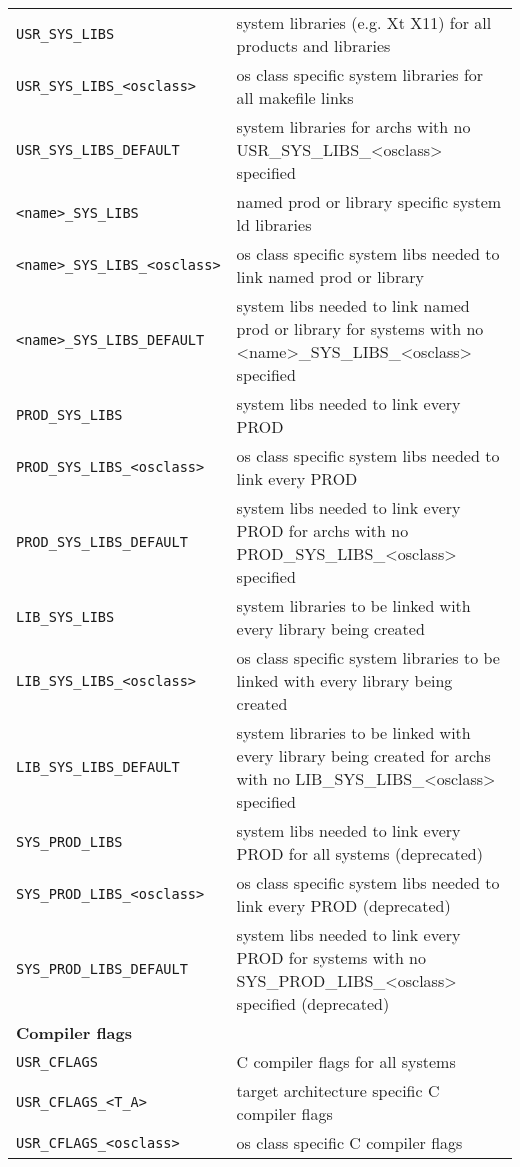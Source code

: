 \begin{center}
\begin{longtable}{p{2.94784in}p{3.76247in}}
\verb|USR_SYS_LIBS| & system libraries (e.g. Xt X11) for all products and libraries\\
\verb|USR_SYS_LIBS_<osclass>| & os class specific system libraries for all makefile links\\
\verb|USR_SYS_LIBS_DEFAULT| & system libraries for archs with no USR\_SYS\_LIBS\_\textless{}osclass\textgreater{} specified\\
\verb|<name>_SYS_LIBS| & named prod or library specific system ld libraries\\
\verb|<name>_SYS_LIBS_<osclass>| & os class specific system libs needed to link named prod or library\\
\verb|<name>_SYS_LIBS_DEFAULT| & system libs needed to link named prod or library for systems with no \textless{}name\textgreater{}\_SYS\_LIBS\_\textless{}osclass\textgreater{} specified\\
\verb|PROD_SYS_LIBS| & system libs needed to link every PROD\\
\verb|PROD_SYS_LIBS_<osclass>| & os class specific system libs needed to link every PROD\\
\verb|PROD_SYS_LIBS_DEFAULT| & system libs needed to link every PROD for archs with no PROD\_SYS\_LIBS\_\textless{}osclass\textgreater{} specified\\
\verb|LIB_SYS_LIBS| & system libraries to be linked with every library being created\\
\verb|LIB_SYS_LIBS_<osclass>| & os class specific system libraries to be linked with every library being created\\
\verb|LIB_SYS_LIBS_DEFAULT| & system libraries to be linked with every library being created for archs with no LIB\_SYS\_LIBS\_\textless{}osclass\textgreater{} specified\\
\verb|SYS_PROD_LIBS| & system libs needed to link every PROD for all systems (deprecated)\\
\verb|SYS_PROD_LIBS_<osclass>| & os class specific system libs needed to link every PROD (deprecated)\\
\verb|SYS_PROD_LIBS_DEFAULT| & system libs needed to link every PROD for systems with no SYS\_PROD\_LIBS\_\textless{}osclass\textgreater{} specified (deprecated)\\
\textbf{Compiler flags} & \\
\hline
\verb|USR_CFLAGS| & C compiler flags for all systems\\
\verb|USR_CFLAGS_<T_A>| & target architecture specific C compiler flags\\
\verb|USR_CFLAGS_<osclass>| & os class specific C compiler flags\\

\end{longtable}
\end{center}
